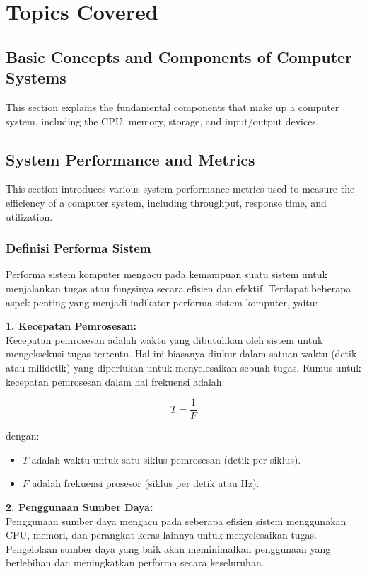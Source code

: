 \documentclass[12pt]{article}
\begin{document}
\section{Topics Covered}

\subsection{Basic Concepts and Components of Computer Systems}
This section explains the fundamental components that make up a computer system, including the CPU, memory, storage, and input/output devices.

\subsection{System Performance and Metrics}
This section introduces various system performance metrics used to measure the efficiency of a computer system, including throughput, response time, and utilization.

\subsubsection{Definisi Performa Sistem}

Performa sistem komputer mengacu pada kemampuan suatu sistem untuk menjalankan tugas atau fungsinya secara efisien dan efektif. Terdapat beberapa aspek penting yang menjadi indikator performa sistem komputer, yaitu:

\textbf{1. Kecepatan Pemrosesan:} \\
Kecepatan pemrosesan adalah waktu yang dibutuhkan oleh sistem untuk mengeksekusi tugas tertentu. Hal ini biasanya diukur dalam satuan waktu (detik atau milidetik) yang diperlukan untuk menyelesaikan sebuah tugas. Rumus untuk kecepatan pemrosesan dalam hal frekuensi adalah:

\[
T = \frac{1}{F}
\]

dengan:
\begin{itemize}
    \item $T$ adalah waktu untuk satu siklus pemrosesan (detik per siklus).
    \item $F$ adalah frekuensi prosesor (siklus per detik atau Hz).
\end{itemize}

\textbf{2. Penggunaan Sumber Daya:} \\
Penggunaan sumber daya mengacu pada seberapa efisien sistem menggunakan CPU, memori, dan perangkat keras lainnya untuk menyelesaikan tugas. Pengelolaan sumber daya yang baik akan meminimalkan penggunaan yang berlebihan dan meningkatkan performa secara keseluruhan.
\end{document}
